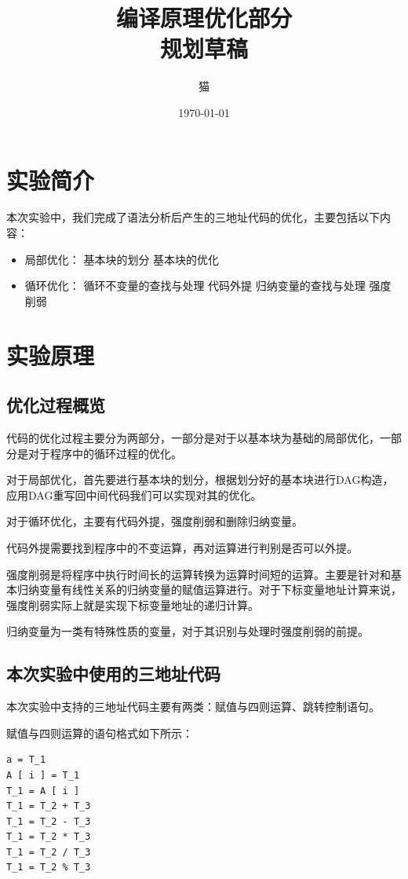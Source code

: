 \documentclass[cn,black,11pt,normal]{elegantnote}
\title{编译原理优化部分\\规划草稿}
\author{猫}
\institute{School of Software Engineering, Tongji University}
\date{\today}
\begin{document}
 
\newpage

\tableofcontents

\section{实验简介}

本次实验中，我们完成了语法分析后产生的三地址代码的优化，主要包括以下内容：

\begin{itemize}
    \item 局部优化：
    \subitem 基本块的划分
    \subitem 基本块的优化
    \item 循环优化：
    \subitem 循环不变量的查找与处理
    \subitem 代码外提
    \subitem 归纳变量的查找与处理
    \subitem 强度削弱
\end{itemize}

\section{实验原理}

\subsection{优化过程概览}

代码的优化过程主要分为两部分，一部分是对于以基本块为基础的局部优化，一部分是对于程序中的循环过程的优化。

对于局部优化，首先要进行基本块的划分，根据划分好的基本块进行DAG构造，应用DAG重写回中间代码我们可以实现对其的优化。

对于循环优化，主要有代码外提，强度削弱和删除归纳变量。

代码外提需要找到程序中的不变运算，再对运算进行判别是否可以外提。

强度削弱是将程序中执行时间长的运算转换为运算时间短的运算。主要是针对和基本归纳变量有线性关系的归纳变量的赋值运算进行。对于下标变量地址计算来说，强度削弱实际上就是实现下标变量地址的递归计算。

归纳变量为一类有特殊性质的变量，对于其识别与处理时强度削弱的前提。

\subsection{本次实验中使用的三地址代码}

本次实验中支持的三地址代码主要有两类：赋值与四则运算、跳转控制语句。

赋值与四则运算的语句格式如下所示：
\begin{lstlisting}
a = T_1
A [ i ] = T_1
T_1 = A [ i ]
T_1 = T_2 + T_3
T_1 = T_2 - T_3
T_1 = T_2 * T_3
T_1 = T_2 / T_3
T_1 = T_2 % T_3
\end{lstlisting}
\end{document}
